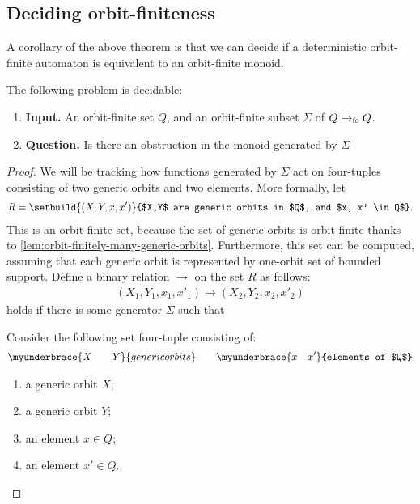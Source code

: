 \subsection{Deciding orbit-finiteness}
\label{sec:deciding-monoids}
A corollary of the above theorem is that we can decide if a deterministic orbit-finite automaton is equivalent to an orbit-finite monoid. 

\begin{theorem}
    The following problem is decidable: 
    \begin{enumerate}
        \item \textbf{Input.} An orbit-finite set $Q$, and an orbit-finite subset $\Sigma$ of $Q \to_{\text{fs}} Q$.
        \item \textbf{Question.} Is there an obstruction in the  monoid generated by $\Sigma$
    \end{enumerate}
\end{theorem}
\begin{proof}
    We will be tracking how functions generated by $\Sigma$ act on four-tuples consisting of two generic orbits and two elements. More formally, let 
    \begin{align*}
    R = \setbuild{(X,Y,x,x')}{$X,Y$ are generic orbits in $Q$, and $x, x' \in Q$}.
    \end{align*}
    This is an orbit-finite set, because the set of generic orbits is orbit-finite thanks to \cref{lem:orbit-finitely-many-generic-orbits}. Furthermore, this set can be computed, assuming that each generic orbit is represented by one-orbit set of bounded support.  Define a binary relation $\to$ on the set $R$ as follows: 
    \begin{align*}
    (X_1,Y_1,x_1,x'_1) \to (X_2,Y_2,x_2,x'_2) 
    \end{align*}
    holds if there is some generator $\Sigma$ such that 


    Consider the following set four-tuple consisting of: 
    \begin{align*}
    \myunderbrace{X \qquad Y}{generic orbits} 
    \qquad 
    \myunderbrace{x \quad x'}{elements of $Q$}
    \end{align*}
    \begin{enumerate}
        \item a generic orbit $X$;
        \item a generic orbit $Y$;
        \item an element $x \in Q$;
        \item an element $x' \in Q$.
    \end{enumerate}

\end{proof}
